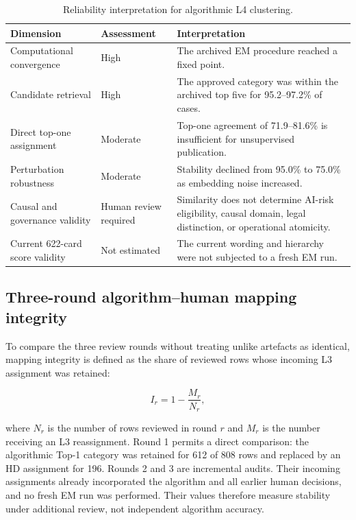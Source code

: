 \documentclass[10pt,a4paper]{article}
\begin{document}
\begin{table}[H]
\centering
\caption{Reliability interpretation for algorithmic L4 clustering.}
\label{tab:reliability}
\begin{tabular}{L{0.31\textwidth}L{0.16\textwidth}L{0.43\textwidth}}
\toprule
Dimension & Assessment & Interpretation \\
\midrule
Computational convergence & High & The archived EM procedure reached a fixed point. \\
Candidate retrieval & High & The approved category was within the archived top five for 95.2--97.2\% of cases. \\
Direct top-one assignment & Moderate & Top-one agreement of 71.9--81.6\% is insufficient for unsupervised publication. \\
Perturbation robustness & Moderate & Stability declined from 95.0\% to 75.0\% as embedding noise increased. \\
Causal and governance validity & Human review required & Similarity does not determine AI-risk eligibility, causal domain, legal distinction, or operational atomicity. \\
Current 622-card score validity & Not estimated & The current wording and hierarchy were not subjected to a fresh EM run. \\
\bottomrule
\end{tabular}
\end{table}

\subsection{Three-round algorithm--human mapping integrity}

To compare the three review rounds without treating unlike artefacts as identical, mapping integrity is defined as the share of reviewed rows whose incoming L3 assignment was retained:

\begin{equation}
I_r = 1 - \frac{M_r}{N_r},
\end{equation}

where $N_r$ is the number of rows reviewed in round $r$ and $M_r$ is the number receiving an L3 reassignment. Round 1 permits a direct comparison: the algorithmic Top-1 category was retained for 612 of 808 rows and replaced by an HD assignment for 196. Rounds 2 and 3 are incremental audits. Their incoming assignments already incorporated the algorithm and all earlier human decisions, and no fresh EM run was performed. Their values therefore measure stability under additional review, not independent algorithm accuracy.
\end{document}
